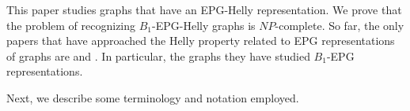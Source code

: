 \documentclass[preprint,12pt]{elsarticle} %
\begin{document}







This paper studies graphs that have an EPG-Helly representation. We prove that the problem of recognizing $ B_1$-EPG-Helly graphs is $NP$-complete.  So far, the only papers that have approached the Helly property related to EPG representations of graphs are \cite{golumbic2009} and \cite{golumbic2013}. In particular, the graphs they have studied $B_1$-EPG representations. 


 
 
 Next, we describe some terminology and notation employed.

\end{document}
